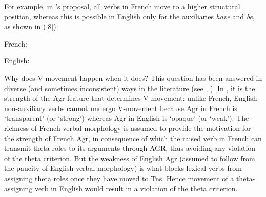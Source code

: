 \documentclass[output=paper]{langsci/langscibook}
\begin{document}
{For example, in \citet{Pollock:89}'s proposal, all verbs in French
move to a higher structural position, whereas this is possible in
English only for the auxiliaries \emph{have} and \emph{be}, as
shown in (\ref{8}):

\eal\label{8}
\ex French:

\ex English:
\zl




\noindent 
Why does V-movement happen when it does? This question
has been answered in diverse (and sometimes inconsistent) ways in
the literature (see \citet{Pollock:89,Pollock:94,Pollock:97a,Pollock:97b}, \citet{Vikner:94,Vikner:97}). In \citet{Pollock:89},
it is the strength of the Agr feature that  determines V-movement: unlike
French, English non-auxiliary verbs  cannot undergo V-movement because Agr in
French is `transparent'  (or `strong') whereas Agr in English is `opaque' (or
`weak'). The  richness of French verbal morphology is assumed to provide
the  motivation for the strength of French Agr, in consequence of which the
raised verb in French can transmit theta roles to its arguments through AGR,
thus avoiding any violation of the theta criterion.  But the weakness of
English Agr (assumed to follow from the paucity of English verbal
morphology) is what blocks lexical verbs from assigning theta roles once
they have moved to Tns. Hence movement of a theta-assigning verb in English
would result in a violation of the theta criterion.

}
\end{document}
